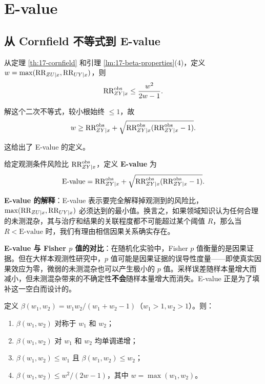 \section{E-value}\label{sec:17-evalue}

\subsection{从 Cornfield 不等式到 E-value}\label{sec:17-from-cornfield-to-evalue}

从定理 \ref{th:17-cornfield} 和引理 \ref{lm:17-beta-properties}(4)，定义 $w = \max(\text{RR}_{ZU\mid x}, \text{RR}_{UY\mid x})$，则
\begin{equation}
\text{RR}_{ZY\mid x}^{\mathrm{obs}} \leq \frac{w^2}{2w - 1} .
\label{eq:17-w-bound}
\end{equation}

解这个二次不等式，较小根始终 $\leq 1$，故
\begin{equation}
w \geq \text{RR}_{ZY\mid x}^{\mathrm{obs}} + \sqrt{\text{RR}_{ZY\mid x}^{\mathrm{obs}}(\text{RR}_{ZY\mid x}^{\mathrm{obs}} - 1)} .
\label{eq:17-w-lower-bound}
\end{equation}

这给出了 E-value 的定义。

\begin{Definition}[E-value]\label{def:17-evalue}
给定观测条件风险比 $\text{RR}_{ZY\mid x}^{\mathrm{obs}}$，定义 \textbf{E-value} 为
\begin{equation}
\mathrm{E\text{-}value} = \text{RR}_{ZY\mid x}^{\mathrm{obs}} + \sqrt{\text{RR}_{ZY\mid x}^{\mathrm{obs}}(\text{RR}_{ZY\mid x}^{\mathrm{obs}} - 1)} .
\label{eq:17-evalue}
\end{equation}
\end{Definition}

\textbf{E-value 的解释}：E-value 表示要完全解释掉观测到的风险比，$\max(\text{RR}_{ZU\mid x}, \text{RR}_{UY\mid x})$ 必须达到的最小值。换言之，如果领域知识认为任何合理的未测混杂，其与治疗和结果的关联程度都不可能超过某个阈值 $R$，那么当 $R < \mathrm{E\text{-}value}$ 时，我们有理由相信因果关系确实存在。

\textbf{E-value 与 Fisher $p$ 值的对比}：在随机化实验中，Fisher $p$ 值衡量的是因果证据。但在大样本观测性研究中，$p$ 值可能是因果证据的误导性度量——即使真实因果效应为零，微弱的未测混杂也可以产生极小的 $p$ 值。采样误差随样本量增大而减小，但未测混杂带来的不确定性\textbf{不会}随样本量增大而消失。E-value 正是为了填补这一空白而设计的。

\begin{Lemma}\label{lm:17-beta-properties}
定义 $\beta(w_1, w_2) = w_1 w_2 / (w_1 + w_2 - 1)$（$w_1 > 1, w_2 > 1$）。则：
\begin{enumerate}
  \item $\beta(w_1, w_2)$ 对称于 $w_1$ 和 $w_2$；
  \item $\beta(w_1, w_2)$ 对 $w_1$ 和 $w_2$ 均单调递增；
  \item $\beta(w_1, w_2) \leq w_1$ 且 $\beta(w_1, w_2) \leq w_2$；
  \item $\beta(w_1, w_2) \leq w^2 / (2w - 1)$，其中 $w = \max(w_1, w_2)$。
\end{enumerate}
\end{Lemma}

